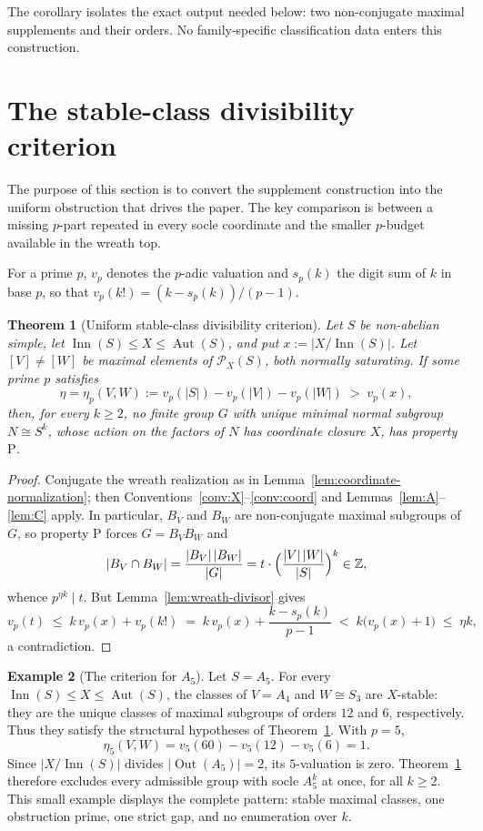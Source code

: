 \documentclass[11pt]{amsart}
\newtheorem{theorem}{Theorem}[section]
\theoremstyle{definition}
\newtheorem{example}[theorem]{Example}
\theoremstyle{remark}
\DeclareMathOperator{\Inn}{Inn}
\DeclareMathOperator{\Aut}{Aut}
\DeclareMathOperator{\Out}{Out}
\newcommand{\Z}{\mathbb{Z}}
\newcommand{\Pos}{\mathcal{P}}
\newcommand{\vp}[1]{v_{#1}}
\begin{document}
The corollary isolates the exact output needed below: two non-conjugate
maximal supplements and their orders. No family-specific classification data
enters this construction.

\section{The stable-class divisibility criterion}\label{sec:criterion}

The purpose of this section is to convert the supplement construction into the
uniform obstruction that drives the paper. The key comparison is between a
missing $p$-part repeated in every socle coordinate and the smaller $p$-budget
available in the wreath top.

For a prime $p$, $\vp{p}$ denotes the $p$-adic valuation and $s_p(k)$ the
digit sum of $k$ in base $p$, so that $\vp{p}(k!)=(k-s_p(k))/(p-1)$.

\begin{theorem}[Uniform stable-class divisibility criterion]\label{thm:D}
Let $S$ be non-abelian simple, let
$\Inn(S)\leq X\leq\Aut(S)$, and put $x:=|X/\Inn(S)|$. Let
$[V]\neq[W]$ be maximal elements of $\Pos_X(S)$, both normally saturating.
If some prime $p$ satisfies
\[
\eta=\eta_p(V,W):=\vp{p}(|S|)-\vp{p}(|V|)-\vp{p}(|W|)\;>\;\vp{p}(x),
\]
then, for every $k\geq2$, no finite group $G$ with unique minimal normal
subgroup $N\cong S^k$, whose action on the factors of $N$ has coordinate
closure $X$, has property $\mathrm{P}$.
\end{theorem}

\begin{proof}
Conjugate the wreath realization as in
Lemma~\ref{lem:coordinate-normalization}; then
Conventions~\ref{conv:X}--\ref{conv:coord} and
Lemmas~\ref{lem:A}--\ref{lem:C} apply.
In particular, $B_V$ and $B_W$ are non-conjugate
maximal subgroups of $G$, so property $\mathrm{P}$ forces $G=B_VB_W$ and
\[
|B_V\cap B_W|=\frac{|B_V|\,|B_W|}{|G|}
 = t\cdot\Bigl(\frac{|V|\,|W|}{|S|}\Bigr)^{k}\in\Z ,
\]
whence $p^{\eta k}\mid t$. But
Lemma~\ref{lem:wreath-divisor} gives
\[
\vp{p}(t)\;\leq\;k\,\vp{p}(x)+\vp{p}(k!)
 \;=\;k\,\vp{p}(x)+\frac{k-s_p(k)}{p-1}
 \;<\;k\bigl(\vp{p}(x)+1\bigr)\;\leq\;\eta k ,
\]
a contradiction.
\end{proof}

\begin{example}[The criterion for $A_5$]\label{ex:a5}
Let $S=A_5$. For every $\Inn(S)\leq X\leq\Aut(S)$, the classes of
$V=A_4$ and $W\cong S_3$ are $X$-stable: they are the unique classes of
maximal subgroups of orders $12$ and $6$, respectively. Thus they satisfy the
structural hypotheses of Theorem~\ref{thm:D}. With $p=5$,
\[
 \eta_5(V,W)=\vp{5}(60)-\vp{5}(12)-\vp{5}(6)=1.
\]
Since $|X/\Inn(S)|$ divides $|\Out(A_5)|=2$, its $5$-valuation is zero.
Theorem~\ref{thm:D} therefore excludes every admissible group with socle
$A_5^k$ at once, for all $k\geq2$. This small example displays the complete
pattern: stable maximal classes, one obstruction prime, one strict gap, and
no enumeration over $k$.
\end{example}
\end{document}
